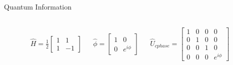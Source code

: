 \documentclass[9pt]{beamer}
\begin{document}
\begin{frame}{Quantum Information}
\begin{columns}
\begin{column}{0.5\textwidth}
    \end{column}
  \end{columns}

    \begin{align*}
      \hat{H} = \frac{1}{2}\begin{bmatrix}1 & 1 \\ 1 & -1\end{bmatrix}
      && \hat{\phi} = \begin{bmatrix} 1 & 0 \\ 0 & e^{i\phi}\end{bmatrix}
      && \hat{U}_{cphase} = \begin{bmatrix} 1 & 0 & 0 & 0 \\ 0 & 1 & 0 & 0 \\ 
                                        0 & 0 & 1 & 0 \\ 0 & 0 & 0 & e^{i\phi}
                        \end{bmatrix}
   \end{align*}

\end{frame}
\end{document}
